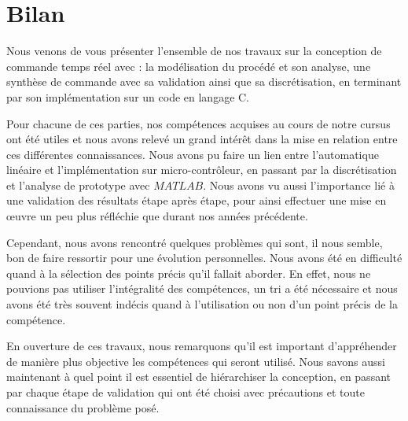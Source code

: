 \chapter{Bilan }
Nous venons de vous présenter l'ensemble de nos travaux sur la conception de commande temps réel avec : la modélisation du procédé et son analyse, une synthèse de commande avec sa validation ainsi que sa discrétisation, en terminant par son implémentation sur un code en langage C. 


Pour chacune de ces parties, nos compétences acquises au cours de notre cursus ont été utiles et nous avons relevé un grand intérêt dans la mise en relation entre ces différentes connaissances. Nous avons pu faire un lien entre l'automatique linéaire et l'implémentation sur micro-contrôleur, en passant par la discrétisation et l'analyse de prototype avec $MATLAB$. Nous avons vu aussi l'importance lié à une validation des résultats étape après étape, pour ainsi effectuer une mise en œuvre un peu plus réfléchie que durant nos années précédente.

Cependant, nous avons rencontré quelques problèmes qui sont, il nous semble, bon de faire ressortir pour une évolution personnelles. Nous avons été en difficulté quand à la sélection des points précis qu'il fallait aborder. En effet, nous ne pouvions pas utiliser l'intégralité des compétences, un tri a été nécessaire et nous avons été très souvent indécis quand à l'utilisation ou non d'un point précis de la compétence.


En ouverture de ces travaux, nous remarquons qu'il est important d’appréhender de manière plus objective les compétences qui seront utilisé. Nous savons aussi maintenant à quel point il est essentiel de hiérarchiser la conception, en passant par chaque étape de validation qui ont été choisi avec précautions et toute connaissance du problème posé.
